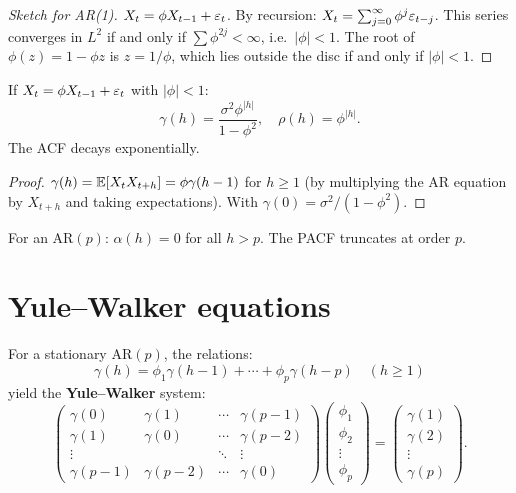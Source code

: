 \begin{proof}[Sketch for AR(1)]
$X_t = \phi X_{t-1}+\varepsilon_t$. By recursion: $X_t = \sum_{j=0}^{\infty}\phi^j\varepsilon_{t-j}$. This series converges in $L^2$ if and only if $\sum\phi^{2j}<\infty$, i.e.\ $|\phi|<1$. The root of $\phi(z)=1-\phi z$ is $z=1/\phi$, which lies outside the disc if and only if $|\phi|<1$.
\end{proof}

\begin{theorem}[ACF of an AR(1)]
If $X_t = \phi X_{t-1}+\varepsilon_t$ with $|\phi|<1$:
\[
\gamma(h) = \frac{\sigma^2\phi^{|h|}}{1-\phi^2}, \quad \rho(h)=\phi^{|h|}.
\]
The ACF decays exponentially.
\end{theorem}

\begin{proof}
$\gamma(h)=\mathbb{E}[X_t X_{t+h}]=\phi\gamma(h-1)$ for $h\geq 1$ (by multiplying the AR equation by $X_{t+h}$ and taking expectations). With $\gamma(0)=\sigma^2/(1-\phi^2)$.
\end{proof}

\begin{theorem}[PACF of an AR$(p)$]
For an AR$(p)$: $\alpha(h)=0$ for all $h>p$. The PACF truncates at order $p$.
\end{theorem}

\section{Yule--Walker equations}

\begin{definition}
For a stationary AR$(p)$, the relations:
\[
\gamma(h) = \phi_1\gamma(h-1)+\cdots+\phi_p\gamma(h-p) \quad (h\geq 1)
\]
yield the \textbf{Yule--Walker} system:
\[
\begin{pmatrix}\gamma(0)&\gamma(1)&\cdots&\gamma(p-1)\\\gamma(1)&\gamma(0)&\cdots&\gamma(p-2)\\\vdots&&\ddots&\vdots\\\gamma(p-1)&\gamma(p-2)&\cdots&\gamma(0)\end{pmatrix}
\begin{pmatrix}\phi_1\\\phi_2\\\vdots\\\phi_p\end{pmatrix}
=\begin{pmatrix}\gamma(1)\\\gamma(2)\\\vdots\\\gamma(p)\end{pmatrix}.
\]
\end{definition}

